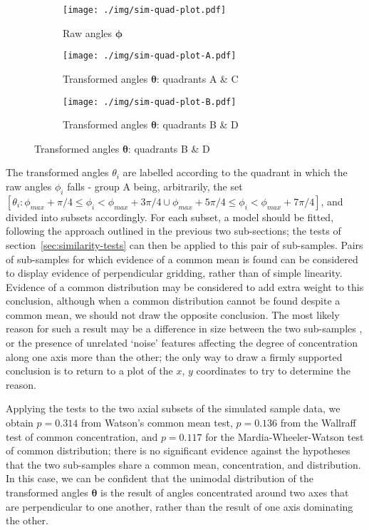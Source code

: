 \documentclass[../../ArchStats.tex]{subfiles}
\begin{document}
\begin{figure}[!h]
\centering
\caption{Data divided into two pairs of opposing quadrants, representing the axes of the grid }
\label{fig:sim-quad-plot-1}
\begin{subfigure}[t]{0.3\textwidth}
\caption{Raw angles $\boldsymbol{\phi}$}
\texttt{[image: ./img/sim-quad-plot.pdf]}
\end{subfigure}
\begin{subfigure}[t]{0.3\textwidth}
\caption{Transformed angles $\boldsymbol{\theta}$: quadrants A \& C}
\texttt{[image: ./img/sim-quad-plot-A.pdf]}
\end{subfigure}
\begin{subfigure}[t]{0.3\textwidth}
\caption{Transformed angles $\boldsymbol{\theta}$: quadrants B \& D}
\texttt{[image: ./img/sim-quad-plot-B.pdf]}
\end{subfigure}
\end{figure}

The transformed angles $\theta_i$ are labelled according to the quadrant in which the raw angles $\phi_i$ falls - group A being, arbitrarily, the set  $[\theta_i: \phi_{max} + \pi/4 \leq \phi_i < \phi_{max} + 3\pi/4 \cup \phi_{max} + 5\pi/4 \leq \phi_i < \phi_{max} + 7\pi/4]$, and divided into subsets accordingly. For each subset, a model should be fitted, following the approach outlined in the previous two sub-sections; the tests of section~\ref{sec:similarity-tests} can then be applied to this pair of sub-samples. Pairs of sub-samples for which evidence of a common mean is found can be considered to display evidence of perpendicular gridding, rather than of simple linearity. Evidence of a common distribution may be considered to add extra weight to this conclusion, although when a common distribution cannot be found despite a common mean, we should not draw the opposite conclusion. The most likely reason for such a result may be a difference in size between the two sub-samples , or the presence of unrelated `noise' features affecting the degree of concentration along one axis more than the other; the only way to draw a firmly supported conclusion is to return to a plot of the $x$, $y$ coordinates to try to determine the reason. 


Applying the tests to the two axial subsets of the simulated sample data, we obtain $p = 0.314$ from Watson's common mean test, $p=0.136$ from the Wallraff test of common concentration, and $p = 0.117$ for the Mardia-Wheeler-Watson test of common distribution; there is no significant evidence against the hypotheses that the two sub-samples share a common mean, concentration, and distribution. In this case, we can be confident that the unimodal distribution of the transformed angles $\boldsymbol{\theta}$ is the result of angles concentrated around two axes that are perpendicular to one another, rather than the result of one axis dominating the other.
\end{document}
